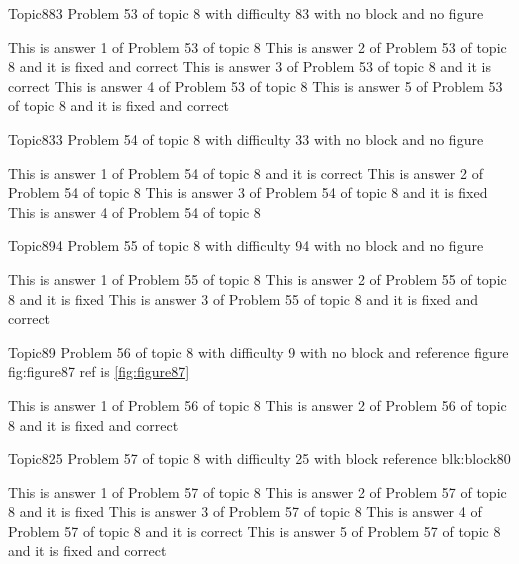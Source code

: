 \documentclass[master]{exam}
\begin{document}
\begin{problem}{Topic8}{83}
	Problem 53 of topic 8 with difficulty 83 with no block and no figure
	\begin{answers}
		\answer This is answer 1 of Problem 53 of topic 8 
		 This is answer 2 of Problem 53 of topic 8 and it is fixed and correct
		\answer[correct] This is answer 3 of Problem 53 of topic 8 and it is correct
		\answer This is answer 4 of Problem 53 of topic 8 
		 This is answer 5 of Problem 53 of topic 8 and it is fixed and correct
	\end{answers}
\end{problem}

\begin{problem}{Topic8}{33}
	Problem 54 of topic 8 with difficulty 33 with no block and no figure
	\begin{answers}
		\answer[correct] This is answer 1 of Problem 54 of topic 8 and it is correct
		\answer This is answer 2 of Problem 54 of topic 8 
		\answer[fixed] This is answer 3 of Problem 54 of topic 8 and it is fixed
		\answer This is answer 4 of Problem 54 of topic 8 
	\end{answers}
\end{problem}

\begin{problem}{Topic8}{94}
	Problem 55 of topic 8 with difficulty 94 with no block and no figure
	\begin{answers}
		\answer This is answer 1 of Problem 55 of topic 8 
		\answer[fixed] This is answer 2 of Problem 55 of topic 8 and it is fixed
		 This is answer 3 of Problem 55 of topic 8 and it is fixed and correct
	\end{answers}
\end{problem}

\begin{problem}{Topic8}{9}
	Problem 56 of topic 8 with difficulty 9 with no block and reference figure fig:figure87 ref is \ref{fig:figure87}
	\begin{answers}
		\answer This is answer 1 of Problem 56 of topic 8 
		 This is answer 2 of Problem 56 of topic 8 and it is fixed and correct
	\end{answers}
\end{problem}

\begin{problem}[requires=blk:block80]{Topic8}{25}
	Problem 57 of topic 8 with difficulty 25 with block reference blk:block80
	\begin{answers}
		\answer This is answer 1 of Problem 57 of topic 8 
		\answer[fixed] This is answer 2 of Problem 57 of topic 8 and it is fixed
		\answer This is answer 3 of Problem 57 of topic 8 
		\answer[correct] This is answer 4 of Problem 57 of topic 8 and it is correct
		 This is answer 5 of Problem 57 of topic 8 and it is fixed and correct
	\end{answers}
\end{problem}
\end{document}
